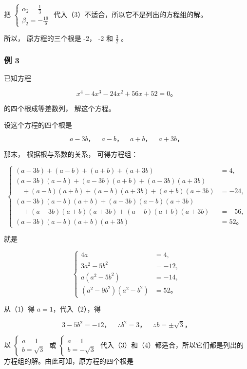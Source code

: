 把
\(\left\{ \begin{array}{l} \alpha_{2} = \frac{1}{3} \\ \beta_{2} = -\frac{19}{6} \end{array} \right.\)
代入（3）不适合，所以它不是列出的方程组的解。

所以， 原方程的三个根是 -2， -2 和 \(\frac{3}{2}\) 。

\subsubsection{例 3}

已知方程

\[
x^4-4x^3-24x^2+56x+52=0\text{。}
\]

的四个根成等差数列， 解这个方程。

 设这个方程的四个根是

\[
a - 3 b\text{，} \quad a - b\text{，} \quad a + b\text{，} \quad a + 3 b\text{，}
\]

那末， 根据根与系数的关系， 可得方程组：

\[
\left\{
\begin{aligned}
(a-3b)+(a-b)+(a+b)+(a+3b)&=4,\\
(a-3b)(a-b)+(a-3b)(a+b)+(a-3b)(a+3b)&\\
\quad +(a-b)(a+b)+(a-b)(a+3b)+(a+b)(a+3b)&=-24,\\
(a-3b)(a-b)(a+b)+(a-3b)(a-b)(a+3b)&\\
\quad +(a-3b)(a+b)(a+3b)+(a-b)(a+b)(a+3b)&=-56,\\
(a-3b)(a-b)(a+b)(a+3b)&=52\text{。}
\end{aligned}
\right.
\]

就是

\[
\left\{
\begin{aligned}
4a&=4,\\
3a^2-5b^2&=-12,\\
a(a^2-5b^2)&=-14,\\
(a^2-9b^2)(a^2-b^2)&=52\text{。}
\end{aligned}
\right.
\]

从（1）得 \(a = 1\)，代入（2），得

\[
3 - 5 b ^ {2} = - 12\text{，} \quad \therefore b ^ {2} = 3\text{，} \quad \therefore b = \pm \sqrt {3}\text{，}
\]

以
\(\left\{ \begin{array}{l} a = 1 \\ b = \sqrt{3} \end{array} \right.\)
或
\(\left\{ \begin{array}{l} a = 1 \\ b = -\sqrt{3} \end{array} \right.\)
代入（3）和（4）都适合，所以它们都是列出的方程组的解。由此可知，原方程的四个根是


